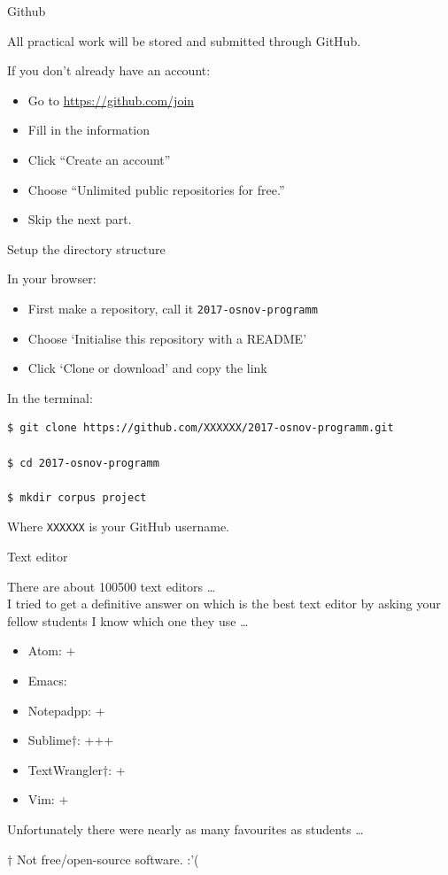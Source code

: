 \documentclass[10pt, compress]{beamer}
\begin{document}
\begin{frame}{Github}

All practical work will be stored and submitted through GitHub.

If you don't already have an account:
\begin{itemize}
 \item Go to \url{https://github.com/join}
 \item Fill in the information
 \item Click ``Create an account''
 \item Choose ``Unlimited public repositories for free.''
 \item Skip the next part.
\end{itemize}

\end{frame}

\begin{frame}[fragile]{Setup the directory structure}

In your browser:
\begin{itemize}
  \item First make a repository, call it {\tt 2017-osnov-programm}
  \item Choose `Initialise this repository with a README'
  \item Click `Clone or download' and copy the link
\end{itemize}

In the terminal:

\begin{verbatim}
$ git clone https://github.com/XXXXXX/2017-osnov-programm.git

$ cd 2017-osnov-programm

$ mkdir corpus project
\end{verbatim}

Where {\tt XXXXXX} is your GitHub username.



\end{frame}

\begin{frame}{Text editor}

There are about 100500 text editors \ldots
~\\

I tried to get a definitive answer on which is the best text editor by asking
your fellow students I know which one they use \ldots

\begin{itemize}
\item Atom: +
\item Emacs:
\item Notepadpp: +
\item Sublime$\dagger$: +++
\item TextWrangler$\dagger$: +
\item Vim: +
\end{itemize}

Unfortunately there were nearly as many favourites as students \ldots

$\dagger$ Not free/open-source software. :'(

\end{frame}
\end{document}
